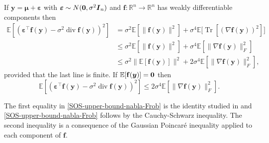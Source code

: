 \documentclass[11pt]{amsart}
\numberwithin{equation}{section}
\numberwithin{equation}{section}
\def\real{{\mathbb{R}}}
\def\R{{\real}}
\def\E{{\mathbb{E}}}
\DeclareMathOperator{\trace}{Tr}
\def\mathbold{\boldsymbol} %
\def\bI{\mathbold{I}}\def\hbI{{\widehat{\bI}}}\def\tbI{{\widetilde{\bI}}}
\def\by{\mathbold{y}}\def\yhat{\widehat{y}}\def\ytil{\widetilde{y}}\def\ybar{{\overline y}}\def\vby{{\bf y}}
\def\ep{\varepsilon}\def\eps{\epsilon}\def\veps{\varepsilon}
\def\bep{ {\mathbold{\ep} }}
\def\bmu{\mathbold{\mu}}\def\muhat{\widehat{\mu}}\def\hmu{\widehat{\mu}}
\DeclareMathOperator{\dv}{div}
\begin{document}
\begin{proposition}
    \label{prop:BZ18}
If $\by = \bmu + \bep$ with $\bep\sim N({\bf 0},\sigma^2\bI_n)$ %
and $\mathbf{f}:\R^n\to\R^n$ has weakly differentiable components
then
\begin{align}
    \nonumber
\E[(\bep^\top \mathbf{f}(\by) - \sigma^2\dv \mathbf{f}(\by))^2] 
    &=
    \sigma^2 \E[\|\mathbf{f}(\by)\|^2] + \sigma^4\E\bigl[\trace[\left(\nabla \mathbf{f}(\by)\right)^2]\bigr] 
    \\&\le 
    \sigma^2 \E[\|\mathbf{f}(\by)\|^2] + \sigma^4\E[\|\nabla \mathbf{f}(\by)\|_F^2]
    \label{SOS-upper-bound-nabla-Frob}
    \\&\le
    \sigma^2\|\E[\mathbf{f}(\by)]\|^2 + 2 \sigma^4\E[\|\nabla \mathbf{f}(\by)\|_F^2],
    \label{SOS-followed-by-Poincare}
\end{align}
provided that the last line is finite. If $\E[\mathbf{f}(\by)]={\bf 0}$ then
\begin{equation}
    \E[(\bep^\top \mathbf{f}(\by) - \sigma^2\dv \mathbf{f}(\by))^2] 
    \le 
    2 \sigma^4\E[\|\nabla \mathbf{f}(\by)\|_F^2].
    \label{SOS-upper-bound-expectation-zero}
\end{equation}
\end{proposition}
The first equality in \eqref{SOS-upper-bound-nabla-Frob}
is the identity studied in \cite{bellec_zhang2018second_stein} and
\eqref{SOS-upper-bound-nabla-Frob}
follows by the Cauchy-Schwarz inequality.
The second inequality is a consequence of the Gaussian Poincar\'e inequality
\cite[Theorem 3.20]{boucheron2013concentration} applied to 
each component of $\mathbf{f}$.
\end{document}
